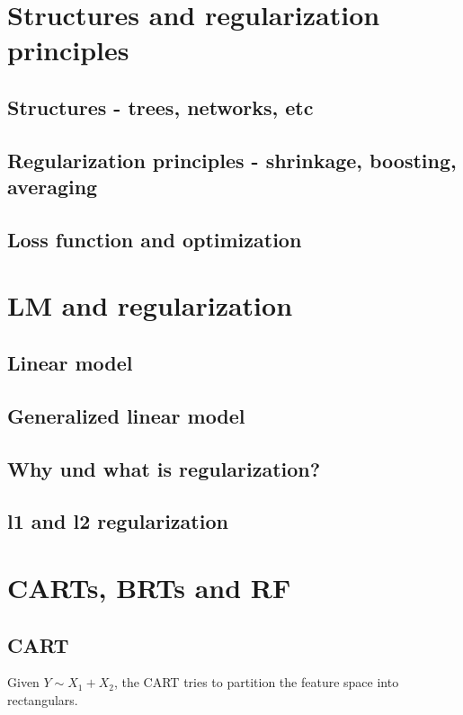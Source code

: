 \documentclass[a4paper,twoside]{tufte-book}\usepackage[]{graphicx}\usepackage[]{color}
\begin{document}

\section{Structures and regularization principles}

\subsection{Structures - trees, networks, etc}

\subsection{Regularization principles - shrinkage, boosting, averaging}

\subsection{Loss function and optimization}



\section{LM and regularization}

\subsection{Linear model}

\subsection{Generalized linear model}

\subsection{Why und what is regularization?}


\subsection{l1 and l2 regularization}


\section{CARTs, BRTs and RF}

\subsection{CART}
Given $Y \sim X_1 + X_2$, the CART tries to partition the feature space into rectangulars.
\end{document}

